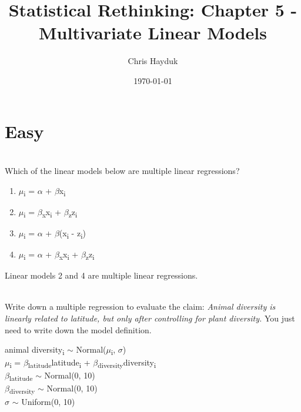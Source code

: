 \documentclass[12pt]{article}\usepackage[]{graphicx}\usepackage[]{color}
\newenvironment{problem}[2][Problem]{\begin{trivlist}
\item[\hskip \labelsep {\bfseries #1}\hskip \labelsep {\bfseries #2.}]}{\end{trivlist}}
\begin{document}
\title{Statistical Rethinking: Chapter 5 - Multivariate Linear Models}

\author{Chris Hayduk}
\date{\today}

\maketitle




\section{Easy}

\begin{problem}{5E1}
\text{ }\\
Which of the linear models below are multiple linear regressions?
\begin{enumerate}
	\item $\mu$\textsubscript{i} = $\alpha$ + $\beta$x\textsubscript{i}
	\item $\mu$\textsubscript{i} = $\beta$\textsubscript{x}x\textsubscript{i} + $\beta$\textsubscript{z}z\textsubscript{i}
	\item $\mu$\textsubscript{i} = $\alpha$ + $\beta$(x\textsubscript{i} - z\textsubscript{i})
	\item $\mu$\textsubscript{i} = $\alpha$ + $\beta$\textsubscript{x}x\textsubscript{i} + $\beta$\textsubscript{z}z\textsubscript{i}
\end{enumerate}
\end{problem}

Linear models 2 and 4 are multiple linear regressions.

\begin{problem}{5E2}
\text{ }\\
Write down a multiple regression to evaluate the claim: \textit{Animal diversity is linearly related to latitude, but only after controlling for plant diversity.} You just need to write down the model definition.
\end{problem}

\begin{center}
animal diversity\textsubscript{i} $\sim$ Normal($\mu$\textsubscript{i}, $\sigma$)\\
$\mu$\textsubscript{i} = $\beta$\textsubscript{latitude}latitude\textsubscript{i} + $\beta$\textsubscript{diversity}diversity\textsubscript{i}\\
$\beta$\textsubscript{latitude} $\sim$ Normal(0, 10)\\
$\beta$\textsubscript{diversity} $\sim$ Normal(0, 10)\\
$\sigma$ $\sim$ Uniform(0, 10)
\end{center}
\end{document}
